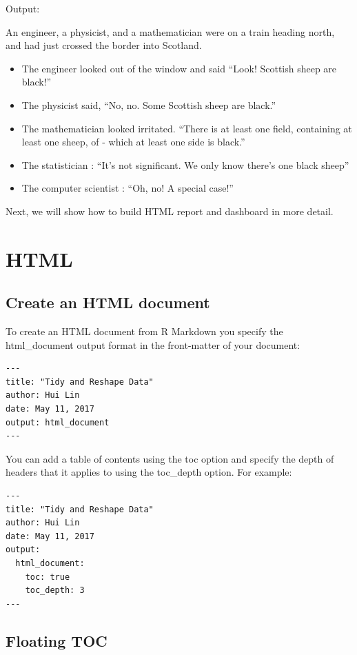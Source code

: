 \documentclass[]{book}
\providecommand{\tightlist}{%
  \setlength{\itemsep}{0pt}\setlength{\parskip}{0pt}}
\theoremstyle{definition}
\theoremstyle{definition}
\theoremstyle{remark}
\begin{document}
Output:

An engineer, a physicist, and a mathematician were on a train heading
north, and had just crossed the border into Scotland.

\begin{itemize}
\tightlist
\item
  The engineer looked out of the window and said ``Look! Scottish sheep
  are black!''
\item
  The physicist said, ``No, no. Some Scottish sheep are black.''
\item
  The mathematician looked irritated. ``There is at least one field,
  containing at least one sheep, of - which at least one side is
  black.''
\item
  The statistician : ``It's not significant. We only know there's one
  black sheep''
\item
  The computer scientist : ``Oh, no! A special case!''
\end{itemize}

Next, we will show how to build HTML report and dashboard in more
detail.

\section{HTML}\label{html}

\subsection{Create an HTML document}\label{create-an-html-document}

To create an HTML document from R Markdown you specify the
html\_document output format in the front-matter of your document:

\begin{verbatim}
---
title: "Tidy and Reshape Data"
author: Hui Lin
date: May 11, 2017
output: html_document
---
\end{verbatim}

You can add a table of contents using the toc option and specify the
depth of headers that it applies to using the toc\_depth option. For
example:

\begin{verbatim}
---
title: "Tidy and Reshape Data"
author: Hui Lin
date: May 11, 2017
output:
  html_document:
    toc: true
    toc_depth: 3
---
\end{verbatim}

\subsection{Floating TOC}\label{floating-toc}
\end{document}
